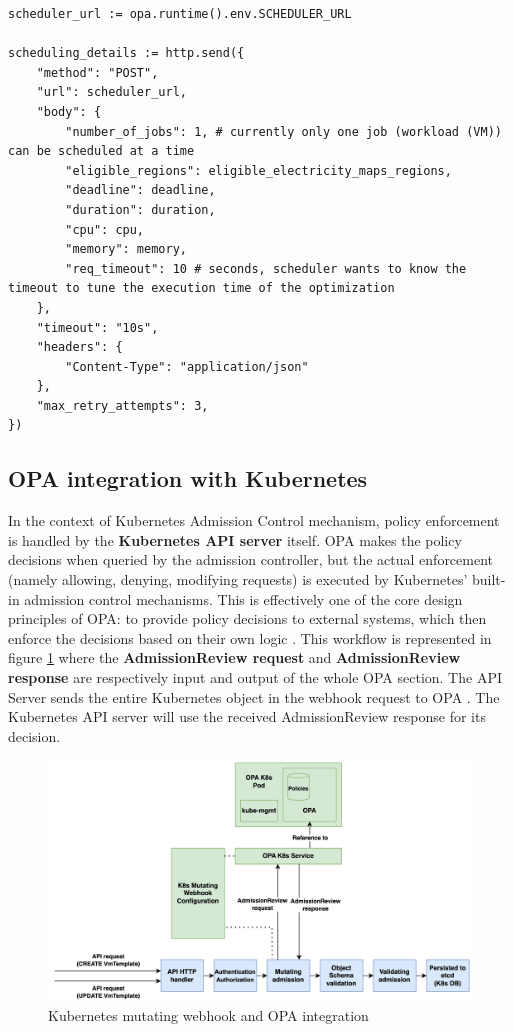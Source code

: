 \begin{lstlisting}[language=rego, caption={OPA external data pull}, label={lst:opa_external_data}]
scheduler_url := opa.runtime().env.SCHEDULER_URL

scheduling_details := http.send({
	"method": "POST",
	"url": scheduler_url,
	"body": {
		"number_of_jobs": 1, # currently only one job (workload (VM)) can be scheduled at a time
		"eligible_regions": eligible_electricity_maps_regions,
		"deadline": deadline,
		"duration": duration, 
		"cpu": cpu,
		"memory": memory,
		"req_timeout": 10 # seconds, scheduler wants to know the timeout to tune the execution time of the optimization
	},
	"timeout": "10s",
	"headers": {
		"Content-Type": "application/json"
	},
	"max_retry_attempts": 3,
})
\end{lstlisting}

\subsection{OPA integration with Kubernetes}

In the context of Kubernetes Admission Control mechanism, policy enforcement is handled by the \textbf{Kubernetes API server} itself. 
OPA makes the policy decisions when queried by the admission controller, but the actual enforcement (namely allowing, denying, modifying requests) is executed by Kubernetes' built-in admission control mechanisms. 
This is effectively one of the core design principles of OPA: to provide policy decisions to external systems, which then enforce the decisions based on their own logic \cite{opa_kubernetes_primer}.
This workflow is represented in figure \ref{fig:webhook_opa} where the \textbf{AdmissionReview request} and \textbf{AdmissionReview response} are respectively input and output of the whole OPA section. 
The API Server sends the entire Kubernetes object in the webhook request to OPA \cite{opa_kubernetes_primer}.
The Kubernetes API server will use the received AdmissionReview response for its decision. \\

\begin{figure}[htb]
\centering
\includegraphics[width=1\linewidth]{images/webhook.png}
\caption{Kubernetes mutating webhook and OPA integration}
\label{fig:webhook_opa}
\end{figure}

